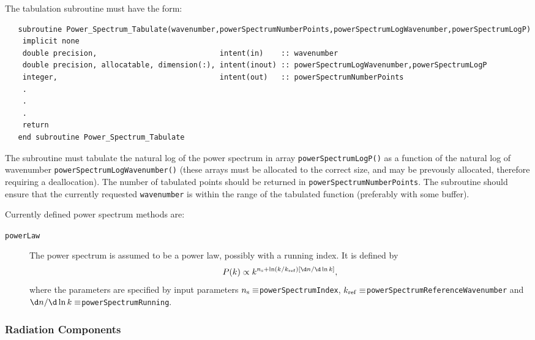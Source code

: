 The tabulation subroutine must have the form:
\begin{verbatim}
   subroutine Power_Spectrum_Tabulate(wavenumber,powerSpectrumNumberPoints,powerSpectrumLogWavenumber,powerSpectrumLogP)
    implicit none
    double precision,                            intent(in)    :: wavenumber
    double precision, allocatable, dimension(:), intent(inout) :: powerSpectrumLogWavenumber,powerSpectrumLogP
    integer,                                     intent(out)   :: powerSpectrumNumberPoints
    .
    .
    .
    return
   end subroutine Power_Spectrum_Tabulate
\end{verbatim}
The subroutine must tabulate the natural log of the power spectrum in array {\tt powerSpectrumLogP()} as a function of the natural log of wavenumber {\tt powerSpectrumLogWavenumber()} (these arrays must be allocated to the correct size, and may be prevously allocated, therefore requiring a deallocation). The number of tabulated points should be returned in {\tt powerSpectrumNumberPoints}. The subroutine should ensure that the currently requested {\tt wavenumber} is within the range of the tabulated function (preferably with some buffer).

Currently defined power spectrum methods are:
\begin{description}
 \item [{\tt powerLaw}] The power spectrum is assumed to be a power law, possibly with a running index. It is defined by
\begin{equation}
 P(k)\propto k^{n_{\rm s} + \ln(k/k_{\rm ref}) [\d n /\d\ln k]},
\end{equation}
where the parameters are specified by input parameters $n_{\rm s}\equiv${\tt powerSpectrumIndex}, $k_{\rm ref}\equiv${\tt powerSpectrumReferenceWavenumber} and $\d n / \d \ln k \equiv${\tt powerSpectrumRunning}.
\end{description}

\subsubsection{Radiation Components}\label{sec:radiationComponents}

